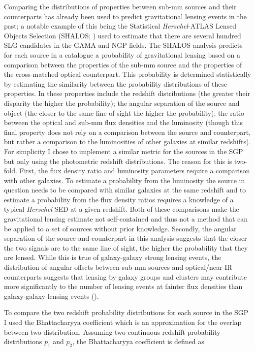Comparing the distributions of properties between sub-mm sources and their counterparts has already been used to predict gravitational lensing events in the past; a notable example of this being the Statistical \textit{Herschel}-ATLAS Lensed Objects Selection (SHALOS; \citealt{Gonzalez-Nuevo_2019}) used to estimate that there are several hundred SLG candidates in the GAMA and NGP fields. The SHALOS analysis predicts for each source in a catalogue a probability of gravitational lensing based on a comparison between the properties of the sub-mm source and the properties of the cross-matched optical counterpart. This probability is determined statistically by estimating the similarity between the probability distributions of these properties. In \citealt{Gonzalez-Nuevo_2019} these properties include the redshift distributions (the greater their disparity the higher the probability); the angular separation of the source and object (the closer to the same line of sight the higher the probability); the ratio between the optical and sub-mm flux densities and the luminosity (though this final property does not rely on a comparison between the source and counterpart, but rather a comparison to the luminosities of other galaxies at similar redshifts). For simplicity I chose to implement a similar metric for the sources in the SGP but only using the photometric redshift distributions. The reason for this is two-fold. First, the flux density ratio and luminosity parameters require a comparison with other galaxies. To estimate a probability from the luminosity the source in question needs to be compared with similar galaxies at the same redshift and to estimate a probability from the flux density ratios requires a knowledge of a typical \textit{Herschel} SED at a given redshift. Both of these comparisons make the gravitational lensing estimate not self-contained and thus not a method that can be applied to a set of sources without prior knowledge. Secondly, the angular separation of the source and counterpart in this analysis suggests that the closer the two signals are to the same line of sight, the higher the probability that they are lensed. While this is true of galaxy-galaxy strong lensing events, the distribution of angular offsets between sub-mm sources and optical/near-IR counterparts suggests that lensing by galaxy groups and clusters may contribute more significantly to the number of lensing events at fainter flux densities than galaxy-galaxy lensing events (\citealt{Bakx_2020}).

To compare the two redshift probability distributions for each source in the SGP I used the Bhattacharyya coefficient which is an approximation for the overlap between two distribution. Assuming two continuous redshift probability distributions $p_1$ and $p_2$, the Bhattacharyya coefficient is defined as

